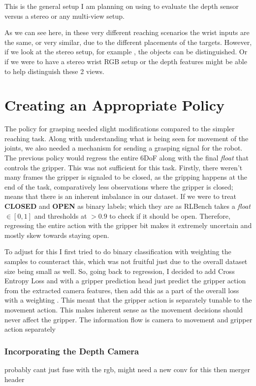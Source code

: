 This is the general setup I am planning on using to evaluate the depth sensor versus a stereo or any multi-view setup. 

As we can see here, in these very different reaching scenarios  the wrist inputs are the same, or very similar, due to the different placements of the targets. However, if we look at the stereo setup, for example , the objects can be distinguished. Or if we were to have a stereo wrist RGB setup  or  the depth features might be able to help distinguish these 2 views.

\section{Creating an Appropriate Policy}
The policy for grasping needed slight modifications compared to the simpler reaching task. Along with understanding what is being seen for movement of the joints, we also needed a mechanism for sending a grasping signal for the robot. The previous policy would regress the entire 6DoF along with the final \emph{float} that controls the gripper. This was not sufficient for this task. Firstly, there weren't many frames the gripper is signaled to be closed, as the gripping happens at the end of the task, comparatively less observations where the gripper is closed; means that there is an inherent imbalance in our dataset. If we were to treat \textbf{CLOSED} and \textbf{OPEN} as binary labels; which they are as RLBench takes a \emph{float} $\in \left[0, 1\right]$ and thresholds at $ > 0.9$ to check if it should be open. Therefore, regressing the entire action with the gripper bit makes it extremely uncertain and mostly skew towards staying open. 

To adjust for this I first tried to do binary classification with weighting the samples to counteract this, which was not fruitful just due to the overall dataset size being small as well. So, going back to regression, I decided to add Cross Entropy Loss and with a gripper prediction head just predict the gripper action from the extracted camera features, then add this as a part of the overall loss with a weighting . This meant that the gripper action is separately tunable to the movement action. This makes inherent sense as the movement decisions should never affect the gripper. The information flow is camera to movement and gripper action separately  


\subsubsection{Incorporating the Depth Camera}
probably cant just fuse with the rgb, might need a new conv for this then merger header


